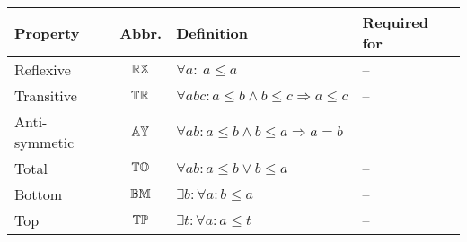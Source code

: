 \begin{tabular}{lcll}
\toprule
Property & Abbr. & Definition & Required for \\
\midrule
Reflexive 		& ${\mathbb{RX}}$	& $\forall a : \ a \leq a $ & --\\
Transitive		& ${\mathbb{TR}}$	& $\forall a b c : a\leq b \wedge b \leq c \Rightarrow a \leq c $ & --\\
Anti-symmetic	& ${\mathbb{AY}}$	& $\forall a b : a\leq b \wedge b \leq a \Rightarrow a = b$ & --\\
Total			& ${\mathbb{TO}}$	& $\forall a b : a\leq b \vee  b\leq a$ & --\\
Bottom			& ${\mathbb{BM}}$	& $\exists b : \forall a : b\leq a$ & --\\
Top				& ${\mathbb{TP}}$	& $\exists t : \forall a : a\leq t$ & --\\
\bottomrule
\end{tabular}
